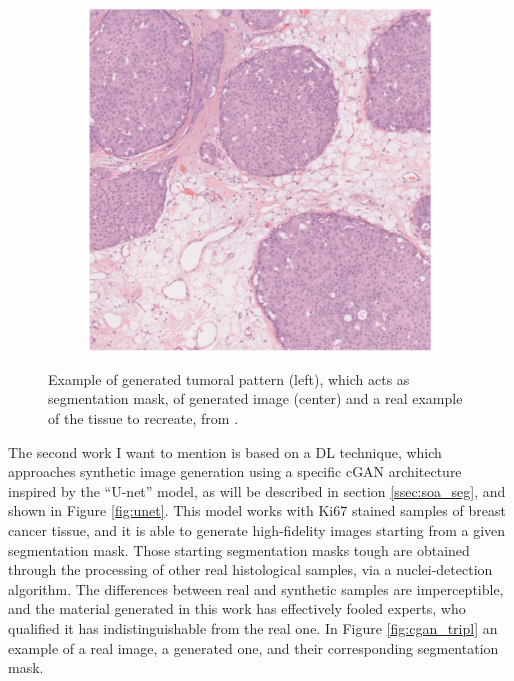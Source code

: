 \begin{figure}[ht]
\begin{subfigure}[t]{0.3\textwidth}
             \caption{}
             \label{fig:morpho_model}
        \end{subfigure}
        \quad
        \begin{subfigure}[t]{0.3\textwidth}
             \centering
             \includegraphics[width = \textwidth]{images/morpho_real}
             \caption{}
             \label{fig:morpho_real}
        \end{subfigure}
        \caption{Example of generated tumoral pattern (left), which acts as segmentation mask, of generated image (center) and a real example of the tissue to recreate, from \cite{10.1117/12.2254452}.}
        \label{fig:morpho_tripl}
    \end{figure}

The second work I want to mention is based on a DL technique, which approaches synthetic image generation using a specific cGAN architecture inspired by the ``U-net'' \cite{Senaras2018} model, as will be described in section \ref{ssec:soa_seg}, and shown in Figure \ref{fig:unet}. This model works with Ki67 stained samples of breast cancer tissue, and it is able to generate high-fidelity images starting from a given segmentation mask. Those starting segmentation masks tough are obtained through the processing of other real histological samples, via a nuclei-detection algorithm. The differences between real and synthetic samples are imperceptible, and the material generated in this work has effectively fooled experts, who qualified it has indistinguishable from the real one. In Figure \ref{fig:cgan_tripl} an example of a real image, a generated one, and their corresponding segmentation mask.

